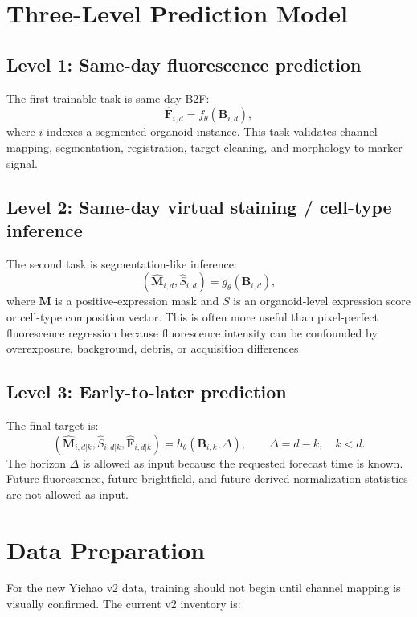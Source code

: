 \documentclass[11pt]{article}
\newcommand{\B}{\mathbf{B}}
\newcommand{\F}{\mathbf{F}}
\newcommand{\M}{\mathbf{M}}
\begin{document}
\section{Three-Level Prediction Model}
\subsection{Level 1: Same-day fluorescence prediction}
The first trainable task is same-day B2F:
\[
\hat{\F}_{i,d}=f_{\theta}(\B_{i,d}),
\]
where \(i\) indexes a segmented organoid instance. This task validates channel mapping, segmentation, registration, target cleaning, and morphology-to-marker signal.

\subsection{Level 2: Same-day virtual staining / cell-type inference}
The second task is segmentation-like inference:
\[
(\hat{\M}_{i,d}, \hat{S}_{i,d}) = g_{\theta}(\B_{i,d}),
\]
where \(\M\) is a positive-expression mask and \(S\) is an organoid-level expression score or cell-type composition vector. This is often more useful than pixel-perfect fluorescence regression because fluorescence intensity can be confounded by overexposure, background, debris, or acquisition differences.

\subsection{Level 3: Early-to-later prediction}
The final target is:
\[
(\hat{\M}_{i,d|k}, \hat{S}_{i,d|k}, \hat{\F}_{i,d|k})
= h_{\theta}(\B_{i,k}, \Delta),\qquad \Delta=d-k,\quad k<d.
\]
The horizon \(\Delta\) is allowed as input because the requested forecast time is known. Future fluorescence, future brightfield, and future-derived normalization statistics are not allowed as input.

\section{Data Preparation}
For the new Yichao v2 data, training should not begin until channel mapping is visually confirmed. The current v2 inventory is:
\end{document}

